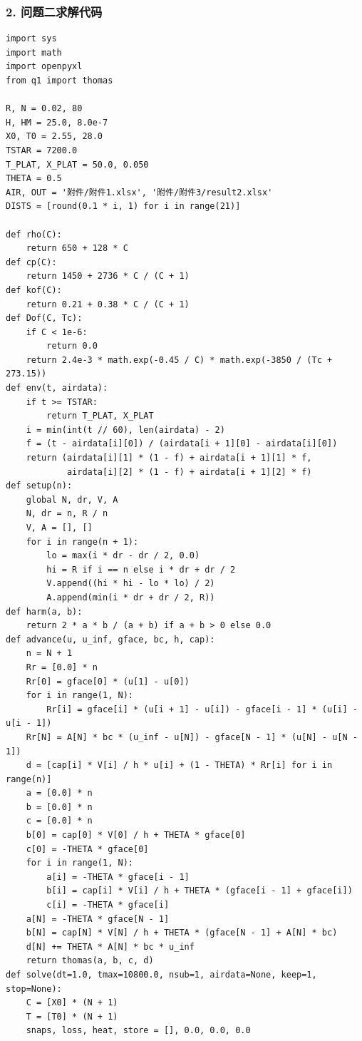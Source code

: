 \documentclass[12pt,a4paper]{article}
\begin{document}
\subsubsection*{2. 问题二求解代码}
\begin{lstlisting}
import sys
import math
import openpyxl
from q1 import thomas

R, N = 0.02, 80                       
H, HM = 25.0, 8.0e-7                  
X0, T0 = 2.55, 28.0                   
TSTAR = 7200.0                        
T_PLAT, X_PLAT = 50.0, 0.050          
THETA = 0.5                           
AIR, OUT = '附件/附件1.xlsx', '附件/附件3/result2.xlsx'
DISTS = [round(0.1 * i, 1) for i in range(21)]

def rho(C):
    return 650 + 128 * C
def cp(C):
    return 1450 + 2736 * C / (C + 1)
def kof(C):
    return 0.21 + 0.38 * C / (C + 1)
def Dof(C, Tc):
    if C < 1e-6:
        return 0.0
    return 2.4e-3 * math.exp(-0.45 / C) * math.exp(-3850 / (Tc + 273.15))
def env(t, airdata):
    if t >= TSTAR:
        return T_PLAT, X_PLAT
    i = min(int(t // 60), len(airdata) - 2)
    f = (t - airdata[i][0]) / (airdata[i + 1][0] - airdata[i][0])
    return (airdata[i][1] * (1 - f) + airdata[i + 1][1] * f,
            airdata[i][2] * (1 - f) + airdata[i + 1][2] * f)
def setup(n):
    global N, dr, V, A
    N, dr = n, R / n
    V, A = [], []
    for i in range(n + 1):
        lo = max(i * dr - dr / 2, 0.0)
        hi = R if i == n else i * dr + dr / 2
        V.append((hi * hi - lo * lo) / 2)
        A.append(min(i * dr + dr / 2, R))
def harm(a, b):
    return 2 * a * b / (a + b) if a + b > 0 else 0.0
def advance(u, u_inf, gface, bc, h, cap):
    n = N + 1
    Rr = [0.0] * n
    Rr[0] = gface[0] * (u[1] - u[0])
    for i in range(1, N):
        Rr[i] = gface[i] * (u[i + 1] - u[i]) - gface[i - 1] * (u[i] - u[i - 1])
    Rr[N] = A[N] * bc * (u_inf - u[N]) - gface[N - 1] * (u[N] - u[N - 1])
    d = [cap[i] * V[i] / h * u[i] + (1 - THETA) * Rr[i] for i in range(n)]
    a = [0.0] * n
    b = [0.0] * n
    c = [0.0] * n
    b[0] = cap[0] * V[0] / h + THETA * gface[0]
    c[0] = -THETA * gface[0]
    for i in range(1, N):
        a[i] = -THETA * gface[i - 1]
        b[i] = cap[i] * V[i] / h + THETA * (gface[i - 1] + gface[i])
        c[i] = -THETA * gface[i]
    a[N] = -THETA * gface[N - 1]
    b[N] = cap[N] * V[N] / h + THETA * (gface[N - 1] + A[N] * bc)
    d[N] += THETA * A[N] * bc * u_inf
    return thomas(a, b, c, d)
def solve(dt=1.0, tmax=10800.0, nsub=1, airdata=None, keep=1, stop=None):
    C = [X0] * (N + 1)
    T = [T0] * (N + 1)
    snaps, loss, heat, store = [], 0.0, 0.0, 0.0

\end{lstlisting}
\end{document}
